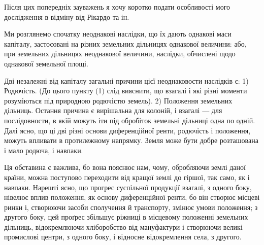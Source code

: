 Після цих попередніх зауважень я хочу коротко подати особливості мого
дослідження в відміну від Рікардо та ін.

Ми розглянемо спочатку неоднакові наслідки, що їх дають однакові маси
капіталу, застосовані на різних земельних дільницях однакової величини: або,
при земельних дільницях неоднакової величини, наслідки, обчислені щодо однакової
земельної площі.

Дві незалежні від капіталу загальні причини цієї неоднаковости наслідків
є: 1) Родючість. (До цього пункту (1) слід вияснити, що взагалі і які
різні моменти розуміються під природною родючістю земель). 2) Положення
земельних дільниць. Остання причина є вирішальна для колоній, і взагалі — для
послідовности, в якій можуть іти під обробіток земельні дільниці одна по одній.
Далі ясно, що ці дві різні основи диференційної ренти, родючість і положення,
можуть впливати в протилежному напрямку. Земля може бути добре розташована
і мало родюча, і навпаки.

Ця обставина є важлива, бо вона пояснює нам, чому, обробляючи землі
даної країни, можна поступово переходити від кращої землі до гіршої, так само,
як і навпаки. Нарешті ясно, що прогрес суспільної продукції взагалі, з одного
боку, нівелює вплив положення, як основу диференційної ренти, бо він створює
місцеві ринки і, створюючи засоби сполучення й транспорту, змінює умови
положення; з другого боку, цей проґрес збільшує ріжниці в місцевому положенні
земельних дільниць, відокремлюючи хліборобство від мануфактури і створюючи
великі промислові центри, з одного боку, і відносне відокремлення села, з другого.

